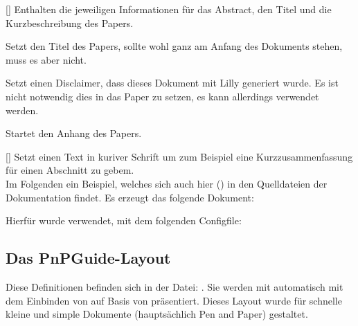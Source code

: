 %
%
%

[\cmdlist{}\cmdlist{}]
Enthalten die jeweiligen Informationen für das Abstract, den Titel und die Kurzbeschreibung des Papers.

%
%
%

Setzt den Titel des Papers, sollte wohl ganz am Anfang des Dokuments stehen, muss es aber nicht.

%
%
%

Setzt einen Disclaimer, dass dieses Dokument mit Lilly generiert wurde. Es ist nicht notwendig dies in das Paper zu setzen, es kann allerdings verwendet werden.

%
%
%

Startet den Anhang des Papers.

%
%
%

[]
Setzt einen Text in kuriver Schrift um zum Beispiel eine Kurzzusammenfassung für einen Abschnitt zu gebem.\\

%
%
%
%
%

Im Folgenden ein Beispiel, welches sich auch hier () in den Quelldateien der Dokumentation findet. Es erzeugt das folgende Dokument:
\begin{tcbraster}[raster columns=3, blankest,colback=white]
\end{tcbraster}
Hierfür wurde \Jake verwendet, mit dem folgenden Configfile:


\subsection{Das PnPGuide-Layout}
Diese Definitionen befinden sich in der Datei: . Sie werden mit  automatisch mit dem Einbinden von  auf Basis von  präsentiert. \medskip\newline
Dieses Layout wurde für schnelle kleine und simple Dokumente (hauptsächlich Pen and Paper) gestaltet.

%
%
%

